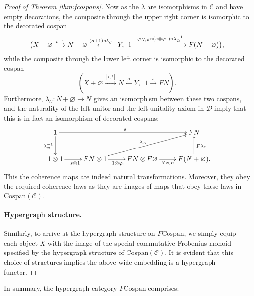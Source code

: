 \begin{proof}[Proof of Theorem \ref{thm:fcospans}]
Now as the $\lambda$ are isomorphisms in $\mathcal C$ and have empty
decorations, the composite through the upper right corner is isomorphic to the
decorated cospan
\[
  \big(X+\varnothing \stackrel{i+1}\longrightarrow N+\varnothing
  \stackrel{(o+1)\circ \lambda^{-1}_{\mathcal C}}\longleftarrow Y,\enspace 1
  \stackrel{\varphi_{N,\varnothing} \circ (s \otimes \varphi_1) \circ
  \lambda^{-1}_{\mathcal D}}{\xrightarrow{\hspace*{2.5cm}}} F(N+\varnothing)\big),
\]
while the composite through the lower left corner is isomorphic to the decorated
cospan
\[
  (X+\varnothing \stackrel{[i,!]}\longrightarrow N
\stackrel{o}\longleftarrow Y,\enspace 1 \stackrel{s}\longrightarrow FN).
\]
Furthermore, $\lambda_{\mathcal C}\colon  N+\varnothing \rightarrow N$ gives an isomorphism
between these two cospans, and the naturality of the left unitor and the left
unitality axiom in $\mathcal D$ imply that this is in fact an isomorphism of
decorated cospans:
\[
  \xymatrix{
    1 \ar[rrr]^{s} \ar[d]_{\lambda^{-1}_{\mathcal D}} &&& FN \\
    1 \otimes 1 \ar[r]_{s \otimes 1} & FN \otimes 1 \ar[r]_{1 \otimes \varphi_1}
    \ar[urr]^{\lambda_{\mathcal D}} & FN \otimes F\varnothing
    \ar[r]_{\varphi_{N,\varnothing}} & F(N+\varnothing).
    \ar[u]_{F\lambda_{\mathcal C}}
  }
\]
This the coherence maps are indeed natural transformations. Moreover, they obey
the required coherence laws as they are images of maps that obey these laws in
$\mathrm{Cospan(\mathcal{C})}$. 

\paragraph{Hypergraph structure.}
Similarly, to arrive at the hypergraph structure on $F\mathrm{Cospan}$, we
  simply equip each object $X$ with the image of the special commutative
  Frobenius monoid specified by the hypergraph structure of
  $\mathrm{Cospan(\mathcal{C})}$. It is evident that this choice of structures
  implies the above wide embedding is a hypergraph functor.
\end{proof}

In summary, the hypergraph category $F\mathrm{Cospan}$ comprises:

